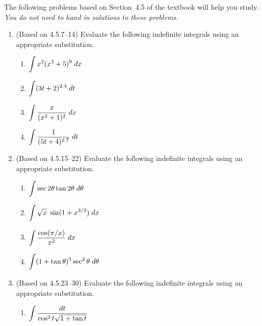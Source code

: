 \documentclass{article}
\title{\commonPSTitleZeroFourFive}
\author{\commonAuthor}
\date{\commonDateZeroFourFive}
\newcommand{\ds}{\displaystyle}
\begin{document}
\maketitle
\thispagestyle{empty}

\noindent
The following problems based on Section~4.5 of the textbook will help
you study.  \emph{You do not need to hand in solutions to these
  problems.}
\begin{enumerate}
\item (Based on 4.5.7--14) %
  Evaluate the following indefinite integrals using an appropriate
  substitution.
  \begin{multicols}{4}
  \begin{enumerate}
  \item $\ds \int x^2(x^3+5)^9 \; dx
    \vphantom{\frac{x}{\sqrt{x}}}$
  \item $\ds \int (3t+2)^{2.4} \; dt
    \vphantom{\frac{x}{\sqrt{x}}}$
  \item $\ds \int \frac{x}{(x^2+1)^2} \; dx
    \vphantom{\frac{x}{\sqrt{x}}}$
  \item $\ds \int \frac{1}{(5t+4)^{2.7}} \; dt
    \vphantom{\frac{x}{\sqrt{x}}}$
  \end{enumerate}
  \end{multicols}
\item (Based on 4.5.15--22) %
  Evaluate the following indefinite integrals using an appropriate
  substitution.
  \begin{multicols}{4}
  \begin{enumerate}
  \item $\ds \int \sec 2\theta \tan 2\theta \; d\theta
    \vphantom{\frac{x}{\sqrt{x}}}$
  \item \mbox{$\ds \int \sqrt{x} \; \sin(1+x^{3/2}) \; dx
    \vphantom{\frac{x}{\sqrt{x}}}$}
  \item $\ds \int \frac{\cos(\pi/x)}{x^2} \; dx
    \vphantom{\frac{x}{\sqrt{x}}}$
  \item \mbox{$\ds \int (1+\tan\theta)^5 \sec^2\theta \; d\theta
    \vphantom{\frac{x}{\sqrt{x}}}$}
  \end{enumerate}
  \end{multicols}
\item (Based on 4.5.23--30) %
  Evaluate the following indefinite integrals using an appropriate
  substitution.
  \begin{multicols}{4}
  \begin{enumerate}
  \item $\ds \int \frac{dt}{\cos^2 t\sqrt{1+\tan t}}
    \vphantom{\frac{x}{\sqrt{x}}}$

\end{enumerate}
\end{multicols}
\end{enumerate}
\end{document}
